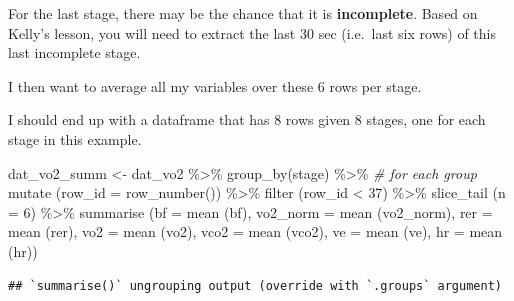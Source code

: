\documentclass[
]{book}
\newenvironment{Shaded}{\begin{snugshade}}{\end{snugshade}}
\newcommand{\AttributeTok}[1]{\textcolor[rgb]{0.77,0.63,0.00}{#1}}
\newcommand{\CommentTok}[1]{\textcolor[rgb]{0.56,0.35,0.01}{\textit{#1}}}
\newcommand{\DecValTok}[1]{\textcolor[rgb]{0.00,0.00,0.81}{#1}}
\newcommand{\FunctionTok}[1]{\textcolor[rgb]{0.00,0.00,0.00}{#1}}
\newcommand{\NormalTok}[1]{#1}
\newcommand{\OtherTok}[1]{\textcolor[rgb]{0.56,0.35,0.01}{#1}}
\newcommand{\SpecialCharTok}[1]{\textcolor[rgb]{0.00,0.00,0.00}{#1}}
\begin{document}
For the last stage, there may be the chance that it is \textbf{incomplete}. Based on Kelly's lesson, you will need to extract the last 30 sec (i.e.~last six rows) of this last incomplete stage.

I then want to average all my variables over these 6 rows per stage.

I should end up with a dataframe that has 8 rows given 8 stages, one for each stage in this example.

\begin{Shaded}
\begin{Highlighting}[]
\NormalTok{dat\_vo2\_summ }\OtherTok{\textless{}{-}}\NormalTok{ dat\_vo2 }\SpecialCharTok{\%\textgreater{}\%}
  \FunctionTok{group\_by}\NormalTok{(stage) }\SpecialCharTok{\%\textgreater{}\%} \CommentTok{\# for each group}
  \FunctionTok{mutate}\NormalTok{ (}\AttributeTok{row\_id =} \FunctionTok{row\_number}\NormalTok{()) }\SpecialCharTok{\%\textgreater{}\%}
  \FunctionTok{filter}\NormalTok{ (row\_id }\SpecialCharTok{\textless{}} \DecValTok{37}\NormalTok{) }\SpecialCharTok{\%\textgreater{}\%}
  \FunctionTok{slice\_tail}\NormalTok{ (}\AttributeTok{n =} \DecValTok{6}\NormalTok{) }\SpecialCharTok{\%\textgreater{}\%}
  \FunctionTok{summarise}\NormalTok{ (}\AttributeTok{bf =} \FunctionTok{mean}\NormalTok{ (bf),}
             \AttributeTok{vo2\_norm =} \FunctionTok{mean}\NormalTok{ (vo2\_norm),}
             \AttributeTok{rer =} \FunctionTok{mean}\NormalTok{ (rer),}
             \AttributeTok{vo2 =} \FunctionTok{mean}\NormalTok{ (vo2),}
             \AttributeTok{vco2 =} \FunctionTok{mean}\NormalTok{ (vco2),}
             \AttributeTok{ve =} \FunctionTok{mean}\NormalTok{ (ve),}
             \AttributeTok{hr =} \FunctionTok{mean}\NormalTok{ (hr))}
\end{Highlighting}
\end{Shaded}

\begin{verbatim}
## `summarise()` ungrouping output (override with `.groups` argument)
\end{verbatim}
\end{document}
